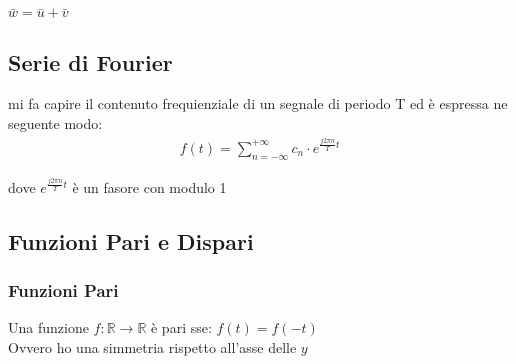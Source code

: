     \noindent
    \begin{center}
        $\bar{w} = \bar{u}+\bar{v}$
    \end{center}
\newpage
\subsection{Serie di Fourier}
    mi fa capire il contenuto frequienziale di un segnale di periodo T ed è espressa ne seguente modo:
    \begin{align*}
        f(t)=\sum_{n=-\infty}^{+\infty} c_n\cdot e^{\frac{j2\pi n}{T}t}
    \end{align*}
    \begin{center}
        dove $e^{\frac{j2\pi n}{T}t}$ è un fasore con modulo 1
    \end{center}
    
\subsection{Funzioni Pari e Dispari}
    \subsubsection{Funzioni Pari}
        Una funzione $f:\mathbb{R}\rightarrow\mathbb{R}$ è pari sse: $f(t)=f(-t)$\\
        Ovvero ho una simmetria rispetto all'asse delle $y$
        \begin{center}
        \end{center}

